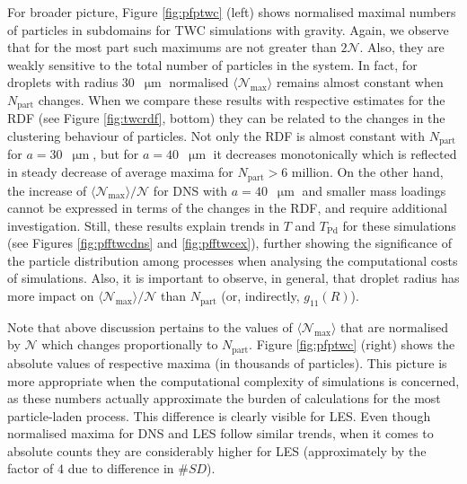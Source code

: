 \documentclass{pracamgren}
\begin{document}
For broader picture, Figure \ref{fig:pfptwc} (left) shows normalised maximal numbers of particles in subdomains for TWC simulations with gravity.
Again, we observe that for the most part such maximums are not greater than $2 \mathcal{N}$.
Also, they are weakly sensitive to the total number of particles in the system.
In fact, for droplets with radius $30$~$\upmu\text{m}$ normalised $\langle \mathcal{N}_{\max} \rangle$ remains almost constant when $N_{\text{part}}$ changes.
When we compare these results with respective estimates for the RDF (see Figure \ref{fig:twcrdf}, bottom) they can be related to the changes in the clustering behaviour of particles.
Not only the RDF is almost constant with $N_{\text{part}}$ for $a = 30$~$\upmu\text{m}$, but for $a = 40$~$\upmu\text{m}$ it decreases monotonically which is reflected in steady decrease of average maxima for $N_{\text{part}} > 6$ million.
On the other hand, the increase of $\langle \mathcal{N}_{\max} \rangle / \mathcal{N}$ for DNS with $a = 40$~$\upmu\text{m}$ and smaller mass loadings cannot be expressed in terms of the changes in the RDF, and require additional investigation.
Still, these results explain trends in $T$ and $T_{\text{Pd}}$ for these simulations (see Figures \ref{fig:pfftwcdns} and \ref{fig:pfftwcex}), further showing the significance of the particle distribution among processes when analysing the computational costs of simulations.
Also, it is important to observe, in general, that droplet radius has more impact on $\langle \mathcal{N}_{\max} \rangle / \mathcal{N}$ than $N_{\text{part}}$ (or, indirectly, $g_{11}(R)$).

Note that above discussion pertains to the values of $\langle \mathcal{N}_{\max} \rangle$  that are normalised by $\mathcal{N}$ which changes proportionally to $N_{\text{part}}$.
Figure \ref{fig:pfptwc} (right) shows the absolute values of respective maxima (in thousands of particles).
This picture is more appropriate when the computational complexity of simulations is concerned, as these numbers actually approximate the burden of calculations for the most particle-laden process.
This difference is clearly visible for LES.
Even though normalised maxima for DNS and LES follow similar trends, when it comes to absolute counts they are considerably higher for LES (approximately by the factor of $4$ due to difference in $\#SD$).
\end{document}
